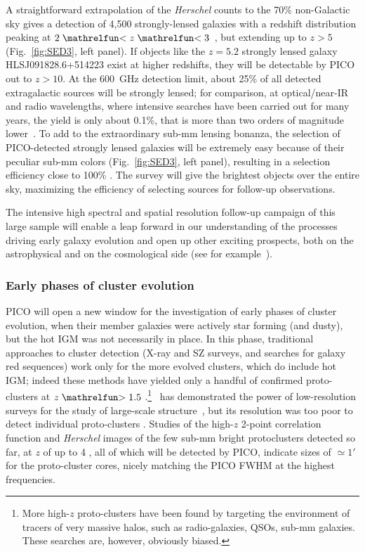 \documentclass[PICOReport.tex]{subfiles}
\begin{document}
A straightforward extrapolation of the \textit{Herschel} counts to the 70\% non-Galactic sky gives a detection of 4,500 strongly-lensed galaxies with a redshift distribution peaking at $2\simlt z \simlt 3$~\cite{Negrello2017lensed}, but extending up to $z> 5$ (Fig.~\ref{fig:SED3}, left panel). If objects like the $z=5.2$ strongly lensed galaxy HLSJ091828.6+514223 exist at higher redshifts, they will be detectable by PICO out to $z>10$. At the 600~GHz detection limit, about 25\% of all detected extragalactic sources will be strongly lensed; for comparison, at optical/near-IR and radio wavelengths, where intensive searches have been carried out for many years, the yield is only about 0.1\%, that is more than two orders of magnitude lower~\cite{Treu2010}. To add to the extraordinary sub-mm lensing bonanza, the selection of PICO-detected strongly lensed galaxies will be extremely easy because of their peculiar sub-mm colors (Fig.~\ref{fig:SED3}, left panel), resulting in a selection efficiency close to 100\% \citep{Negrello2010}. The survey will give the brightest objects over the entire sky, maximizing the efficiency of selecting sources for follow-up observations. 

The intensive high spectral and spatial resolution follow-up campaign of this large sample will enable a leap forward in our understanding of the processes driving early galaxy evolution and open up other exciting prospects, both on the astrophysical and on the cosmological side (see for example~\citet{Treu2010}).

\subsubsection{Early phases of cluster evolution}

PICO will open a new window for the investigation of early phases of cluster evolution, when their member galaxies were actively star forming (and dusty), but the hot \ac{IGM} was not necessarily in place. In this phase, traditional approaches to cluster detection (X-ray and SZ surveys, and searches for galaxy red sequences) work only for the more evolved clusters, which do include hot \ac{IGM}; indeed these methods have yielded only a handful of confirmed proto-clusters at $z\simgt 1.5$ \cite{Overzier2016}.\footnote{More high-$z$ proto-clusters have been found by targeting the environment of tracers of very massive halos, such as radio-galaxies, QSOs, sub-mm galaxies. These searches are, however, obviously biased.} \planck~has demonstrated the power of low-resolution surveys for the study of large-scale structure~\cite{Planck2016high_z}, but its resolution was too poor to detect individual proto-clusters \cite{Negrello2017protocl}.  Studies of the high-$z$ 2-point correlation function \cite{Chen2016, Negrello2017protocl} and \textit{Herschel} images of the few sub-mm bright protoclusters detected so far, at $z$ of up to 4 \cite{Ivison2013, Wang2016, Oteo2018}, all of which will be detected by PICO, indicate sizes of $\simeq 1'$ for the proto-cluster cores, nicely matching the PICO FWHM at the highest frequencies.
\end{document}
